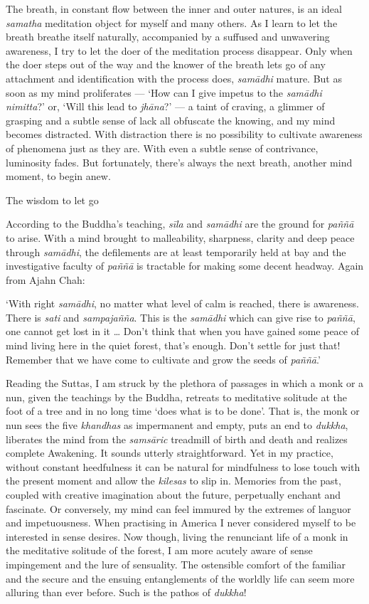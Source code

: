 The breath, in constant flow between the inner and outer natures, is an
ideal \emph{samatha} meditation object for myself and many others. As I
learn to let the breath breathe itself naturally, accompanied by a
suffused and unwavering awareness, I try to let the doer of the
meditation process disappear. Only when the doer steps out of the way
and the knower of the breath lets go of any attachment and
identification with the process does, \emph{samādhi} mature. But as soon
as my mind proliferates --- `How can I give impetus to the \emph{samādhi
nimitta}?' or, `Will this lead to \emph{jhāna}?' --- a taint of craving,
a glimmer of grasping and a subtle sense of lack all obfuscate the
knowing, and my mind becomes distracted. With distraction there is no
possibility to cultivate awareness of phenomena just as they are. With
even a subtle sense of contrivance, luminosity fades. But fortunately,
there's always the next breath, another mind moment, to begin anew.

The wisdom to let go

According to the Buddha's teaching, \emph{sīla} and \emph{samādhi} are
the ground for \emph{paññā} to arise. With a mind brought to
malleability, sharpness, clarity and deep peace through \emph{samādhi},
the defilements are at least temporarily held at bay and the
investigative faculty of \emph{paññā} is tractable for making some
decent headway. Again from Ajahn Chah:

`With right \emph{samādhi}, no matter what level of calm is reached,
there is awareness. There is \emph{sati} and \emph{sampajañña}. This is
the \emph{samādhi} which can give rise to \emph{paññā}, one cannot get
lost in it \ldots{} Don't think that when you have gained some peace of
mind living here in the quiet forest, that's enough. Don't settle for
just that! Remember that we have come to cultivate and grow the seeds of
\emph{paññā}.'

Reading the Suttas, I am struck by the plethora of passages in which a
monk or a nun, given the teachings by the Buddha, retreats to meditative
solitude at the foot of a tree and in no long time `does what is to be
done'. That is, the monk or nun sees the five \emph{khandhas} as
impermanent and empty, puts an end to \emph{dukkha}, liberates the mind
from the \emph{samsāric} treadmill of birth and death and realizes
complete Awakening. It sounds utterly straightforward. Yet in my
practice, without constant heedfulness it can be natural for mindfulness
to lose touch with the present moment and allow the \emph{kilesas} to
slip in. Memories from the past, coupled with creative imagination about
the future, perpetually enchant and fascinate. Or conversely, my mind
can feel immured by the extremes of languor and impetuousness. When
practising in America I never considered myself to be interested in
sense desires. Now though, living the renunciant life of a monk in the
meditative solitude of the forest, I am more acutely aware of sense
impingement and the lure of sensuality. The ostensible comfort of the
familiar and the secure and the ensuing entanglements of the worldly
life can seem more alluring than ever before. Such is the pathos of
\emph{dukkha}!

